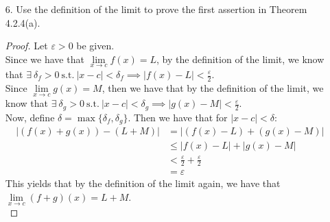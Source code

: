 \documentclass[12pt,letterpaper]{article}
\newcommand{\st}{\ \text{s.t.}\ }
\newcommand{\abs}[1]{\left\lvert #1 \right\rvert}
\newcommand{\R}{\mathbb{R}}
\newcommand{\N}{\mathbb{N}}
\theoremstyle{case}
\theoremstyle{definition}
\newtheorem*{theorem*}{Theorem}
\begin{document}
\begin{enumerate}
\begin{enumerate}
\begin{proof}
				Recall the \textit{Sequential Criterion}:
				\begin{theorem*}[Sequential Criterion]
					Let $f:A \rightarrow \R$ and let $c$ be a cluster point of $A$. Then the following are equivalent.
					\begin{enumerate}
						\item $\lim\limits_{x\to c} f=L$.
						\item For every sequence $(x_n)$ in $A$ that converges to $c$ such that $x_n\neq c$ for all $n \in \N$, the sequence $(f(x_n))$ converges to $L$.
					\end{enumerate}
				\end{theorem*}
				So we have that $\lim\limits_{x \to 0} \cos \left(\frac{1}{x}\right)$ doesn't exist. However, $\lim\limits_{x \to 0}x \cos \left(\frac{1}{x}\right)=0$. This is given to us by the fact that $\abs{x \cos \left(\frac{1}{x}\right)}\leq |x|$. Thus, if we let $\delta = \varepsilon$, we have that $\lim\limits_{x \to 0} x \cos \left(\frac{1}{x}\right)=0$.
			\end{proof}
			
			\item[6.] Use the definition of the limit to prove the first assertion in Theorem 4.2.4(a).\\
			
			\begin{proof}
				Let $\varepsilon>0$ be given.\\
				
				Since we have that $\lim\limits_{x \to c} f(x) = L$, by the definition of the limit, we know that $\exists\ \delta_f > 0 \st |x-c|<\delta_f \implies |f(x)-L|<\frac{\varepsilon}{2}$.\\
				
				Since $\lim\limits_{x \to c} g(x)=M$, then we have that by the definition of the limit, we know that $\exists\ \delta_g > 0 \st |x-c|<\delta_g \implies |g(x)-M|<\frac{\varepsilon}{2}$.\\
				
				Now, define $\delta=\max \{\delta_f, \delta_g\}$. Then we have that for $|x-c|<\delta$:
				\begin{align*}
					|(f(x)+g(x))-(L+M)| &= |(f(x)-L)+(g(x)-M)| \\
					&\leq |f(x)-L| + |g(x)-M| \\
					&< \frac{\varepsilon}{2} + \frac{\varepsilon}{2} \\
					&= \varepsilon
				\end{align*}
				This yields that by the definition of the limit again, we have that $\lim\limits_{x \to c} (f+g)(x) = L+M$.\\
				

\end{proof}
\end{enumerate}
\end{enumerate}
\end{document}
